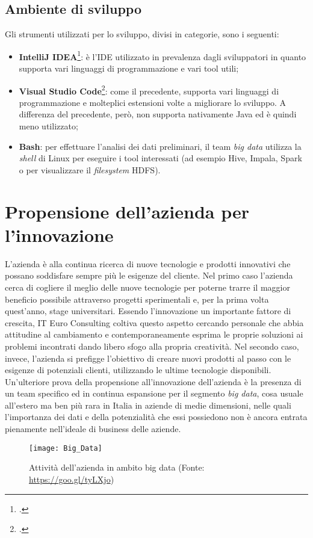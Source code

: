 \subsection{Ambiente di sviluppo}
Gli strumenti utilizzati per lo sviluppo, divisi in categorie, sono i seguenti:
\begin{itemize}
	\item \textbf{IntelliJ IDEA}\footcite{https://www.jetbrains.com/idea/}: è l'\gls{IDE} utilizzato in prevalenza dagli sviluppatori in quanto supporta vari linguaggi di programmazione e vari tool utili;
	\item \textbf{Visual Studio Code}\footcite{https://code.visualstudio.com/}: come il precedente, supporta vari linguaggi di programmazione e molteplici estensioni volte a migliorare lo sviluppo. A differenza del precedente, però, non supporta nativamente Java ed è quindi meno utilizzato;
	\item \textbf{\gls{Bash}}: per effettuare l'analisi dei dati preliminari, il team \textit{big data} utilizza la \textit{shell} di Linux per eseguire i tool interessati (ad esempio Hive, Impala, Spark o per visualizzare il \textit{filesystem} \gls{HDFS}).
\end{itemize}

\section{Propensione dell'azienda per l'innovazione}
L’azienda è alla continua ricerca di nuove tecnologie e prodotti innovativi che possano soddisfare sempre più le esigenze del cliente. Nel primo caso l’azienda cerca di cogliere il meglio delle nuove tecnologie per poterne trarre il maggior beneficio possibile attraverso progetti sperimentali e, per la prima volta quest’anno, stage universitari. Essendo l’innovazione un importante fattore di crescita, IT Euro Consulting coltiva questo aspetto cercando personale che abbia attitudine al cambiamento e contemporaneamente esprima le proprie soluzioni ai problemi incontrati dando libero sfogo alla propria creatività. Nel secondo caso, invece, l’azienda si prefigge l’obiettivo di creare nuovi prodotti al passo con le esigenze di potenziali clienti, utilizzando le ultime tecnologie disponibili.\\
Un'ulteriore prova della propensione all'innovazione dell'azienda è la presenza di un team specifico ed in continua espansione per il segmento \textit{big data}, cosa usuale all'estero ma ben più rara in Italia in aziende di medie dimensioni, nelle quali l'importanza dei dati e della potenzialità che essi possiedono non è ancora entrata pienamente nell'ideale di business delle aziende.
\begin{figure}[!h] 
	\centering 
	\texttt{[image: Big\_Data]} 
	\caption{Attività dell'azienda in ambito big data (Fonte: \href{https://goo.gl/tyLXjo}{https://goo.gl/tyLXjo})}
\end{figure}